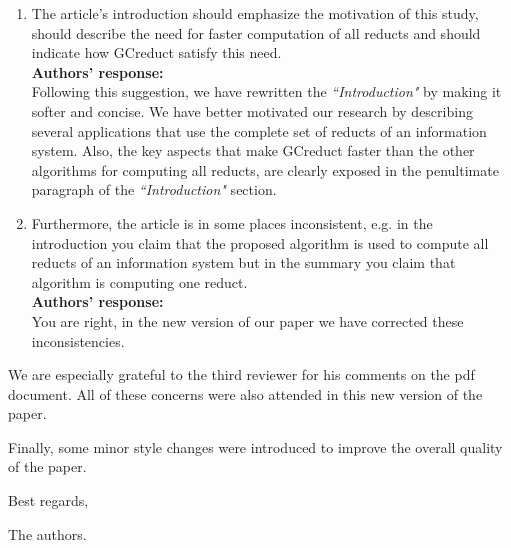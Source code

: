 \documentclass{letter}
\begin{document}
\begin{letter}{}
\begin{enumerate}
	\item The article's introduction should emphasize the motivation of this study, should describe the need for faster computation of all reducts and should indicate how GCreduct satisfy this need.\\
	\textbf{Authors’ response:} \\
	Following this suggestion, we have rewritten the \textit{``Introduction"} by making it softer and concise. We have better motivated our research by describing several applications that use the complete set of reducts of an information system. Also, the key aspects that make GCreduct faster than the other algorithms for computing all reducts, are clearly exposed in the penultimate paragraph of the \textit{``Introduction"} section.
	
	\item Furthermore, the article is in some places inconsistent, e.g. in the introduction you  claim that the proposed algorithm is used to compute all reducts of an information system but in the summary you claim that algorithm is computing one reduct. \\
	\textbf{Authors’ response:} \\
	You are right, in the new version of our paper we have corrected these inconsistencies. 
  \end{enumerate}  
  
  We are especially grateful to the third reviewer for his comments on the pdf document. All of these concerns were also attended in this new version of the paper.
     
  
  
  Finally, some minor style changes were introduced to improve the overall quality of the paper.
  
  Best regards,

  The authors.
\end{letter}
\end{document}
